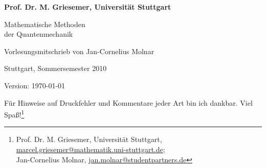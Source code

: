 \documentclass[%
	paper=a5,%
	fleqn,%
	DIV=18,%
	BCOR=0mm,
	fontsize=11pt,
	titlepage=false,%
	bibliography=totoc,
	DIV=18,%
	twoside=true,
	pdftitle=Riemannsche Geometrie,
	pdfauthor=Uwe Semmelmann,
	numbers=noendperiod]%
	{scrbook}
\begin{document}
\begin{titlepage}
\vspace*{2mm}
\noindent\bfseries\color{darkgray}
Prof. Dr. M. Griesemer, Universität Stuttgart

\begin{center}
\vspace*{10mm}
\noindent
{\huge\color{accent} Mathematische Methoden\\
\vspace{2mm}
der Quantenmechanik}

\vspace*{10mm}
Vorlesungsmitschrieb von Jan-Cornelius Molnar

\vspace*{4mm}

Stuttgart, Sommersemester 2010
\end{center}

\vspace*{\fill}

\begin{flushright}
\small
Version: \today
\vspace*{5mm}

Für Hinweise auf Druckfehler und Kommentare jeder Art bin ich dankbar.
Viel Spaß!\footnote{\color{darkgray}
Prof. Dr. M. Griesemer, Universität Stuttgart,
\href{mailto:marcel.griesemer@mathematik.uni-stuttgart.de}{marcel.griesemer@mathematik.uni-stuttgart.de};\\
Jan-Cornelius Molnar,
\href{mailto:jan.molnar@studentpartners.de}{jan.molnar@studentpartners.de}}
\end{flushright}
\end{titlepage}

\tableofcontents
















\end{document}
